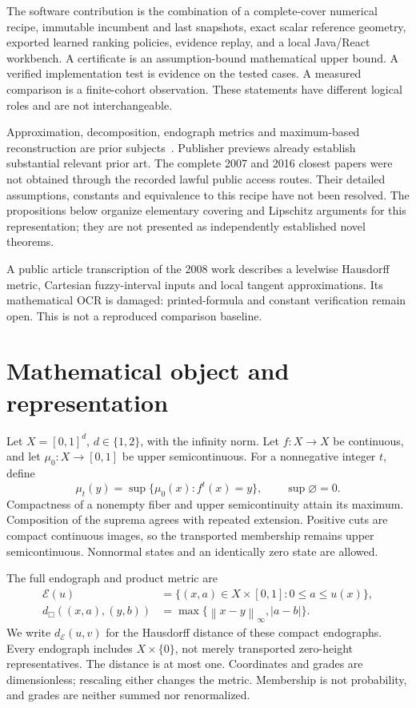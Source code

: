 \documentclass[10pt,a4paper]{article}
\newcommand{\E}{\mathcal{E}}
\newcommand{\dE}{d_{\E}}
\newcommand{\norm}[1]{\left\lVert#1\right\rVert_{\infty}}
\begin{document}
The software contribution is the combination of a complete-cover numerical
recipe, immutable incumbent and last snapshots, exact scalar reference
geometry, exported learned ranking policies, evidence replay, and a local
Java/React workbench. A certificate is an assumption-bound mathematical upper
bound. A verified implementation test is evidence on the tested cases.
A measured comparison is a finite-cohort observation. These statements have
different logical roles and are not interchangeable.

Approximation, decomposition, endograph metrics and maximum-based reconstruction
are prior subjects~\cite{zadeh,roman,decomposition,decomposition2008,kupka2016,pwl}.
Publisher previews already establish substantial relevant prior art. The
complete 2007 and 2016 closest papers were not obtained through the recorded
lawful public access routes. Their detailed assumptions, constants and
equivalence to this recipe have not been resolved. The propositions below
organize elementary covering and Lipschitz arguments for this representation;
they are not presented as independently established novel theorems.

A public article transcription of the 2008 work describes a levelwise
Hausdorff metric, Cartesian fuzzy-interval inputs and local tangent
approximations. Its mathematical OCR is damaged: printed-formula and constant
verification remain open. This is not a reproduced comparison baseline.

\section{Mathematical object and representation}
Let $X=[0,1]^d$, $d\in\{1,2\}$, with the infinity norm. Let
$f:X\to X$ be continuous, and let $\mu_0:X\to[0,1]$ be upper semicontinuous.
For a nonnegative integer $t$, define
\begin{equation}\label{eq:extension}
 \mu_t(y)=\sup\{\mu_0(x):f^t(x)=y\},\qquad\sup\varnothing=0.
\end{equation}
Compactness of a nonempty fiber and upper semicontinuity attain its maximum.
Composition of the suprema agrees with repeated extension. Positive cuts are
compact continuous images, so the transported membership remains upper
semicontinuous. Nonnormal states and an identically zero state are allowed.

The full endograph and product metric are
\begin{align}
 \E(u)&=\{(x,a)\in X\times[0,1]:0\leq a\leq u(x)\},\\
 d_{\Box}((x,a),(y,b))&=\max\{\norm{x-y},|a-b|\}.
\end{align}
We write $\dE(u,v)$ for the Hausdorff distance of these compact endographs.
Every endograph includes $X\times\{0\}$, not merely transported zero-height
representatives. The distance is at most one. Coordinates and grades are
dimensionless; rescaling either changes the metric. Membership is not
probability, and grades are neither summed nor renormalized.
\end{document}
